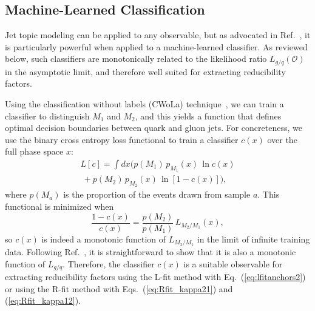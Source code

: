 \documentclass[aps,prd,twocolumn,preprintnumbers,nofootinbib,longbibliography,floatfix]{revtex4-1}
\DeclareRobustCommand{\Eq}[1]{Eq.~(\ref{#1})}
\DeclareRobustCommand{\Eqs}[2]{Eqs.~(\ref{#1}) and (\ref{#2})}
\DeclareRobustCommand{\Ref}[1]{Ref.~\cite{#1}}
\newcommand{\figO}{\mathcal{O}}
\begin{document}



\subsection{Machine-Learned Classification}
\label{subsection:classification}

Jet topic modeling can be applied to any observable, but as advocated in \Ref{Komiske:2018vkc}, it is particularly powerful when applied to a machine-learned classifier.
%
As reviewed below, such classifiers are monotonically related to the likelihood ratio $L_{g/q}(\figO)$ in the asymptotic limit, and therefore well suited for extracting reducibility factors.


Using the classification without labels (CWoLa) technique~\cite{Metodiev:2017vrx}, we can train a classifier to distinguish $M_1$ and $M_2$, and this yields a function that defines optimal decision boundaries between quark and gluon jets.
%
For concreteness, we use the binary cross entropy loss functional to train a classifier $c(x)$ over the full phase space $x$:
%
\begin{multline}
L[c] = \int dx \Big(p(M_1) \, p_{M_1}(x) \,  \ln c(x) \\
~+  p(M_2) \, p_{M_2}(x) \, \ln [1 - c(x)] \Big), 
\end{multline}
%
where $p(M_a)$ is the proportion of the events drawn from sample $a$.
%
This functional is minimized when
%
\begin{equation}
\label{eq:BinCrossEnt}
\frac{1 - c(x)}{c(x)} = \frac{p(M_2)}{p(M_1)} \, L_{M_2 / M_1}(x),
\end{equation}
%
so $c(x)$ is indeed a monotonic function of $L_{M_2 / M_1}$ in the limit of infinite training data.
%
Following \Ref{Metodiev:2017vrx}, it is straightforward to show that it is also a monotonic function of $L_{g/q}$.
%
Therefore, the classifier $c(x)$ is a suitable observable for extracting reducibility factors using the L-fit method with \Eq{eq:lfitanchors2} or using the R-fit method with \Eqs{eq:Rfit_kappa21}{eq:Rfit_kappa12}.
\end{document}
